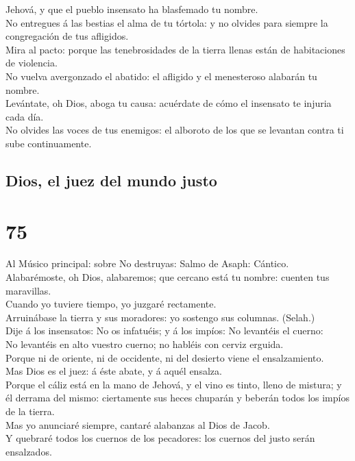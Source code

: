 Jehová, y que el pueblo insensato ha blasfemado tu nombre.\\
 No entregues á las bestias el alma de tu tórtola: y no
olvides para siempre la congregación de tus afligidos.\\
 Mira al pacto: porque las tenebrosidades de la tierra
llenas están de habitaciones de violencia.\\
 No vuelva avergonzado el abatido: el afligido y el
menesteroso alabarán tu nombre.\\
 Levántate, oh Dios, aboga tu causa: acuérdate de cómo el
insensato te injuria cada día.\\
 No olvides las voces de tus enemigos: el alboroto de los
que se levantan contra ti sube continuamente.

\hypertarget{dios-el-juez-del-mundo-justo}{%
\subsection{Dios, el juez del mundo
justo}\label{dios-el-juez-del-mundo-justo}}

\hypertarget{section-19-75}{%
\section{75}\label{section-19-75}}

 Al Músico principal: sobre No destruyas: Salmo de Asaph:
Cántico. Alabarémoste, oh Dios, alabaremos; que cercano está tu nombre:
cuenten tus maravillas.\\
 Cuando yo tuviere tiempo, yo juzgaré rectamente.\\
 Arruinábase la tierra y sus moradores: yo sostengo sus
columnas. (Selah.)\\
 Dije á los insensatos: No os infatuéis; y á los impíos:
No levantéis el cuerno:\\
 No levantéis en alto vuestro cuerno; no habléis con
cerviz erguida.\\
 Porque ni de oriente, ni de occidente, ni del desierto
viene el ensalzamiento.\\
 Mas Dios es el juez: á éste abate, y á aquél ensalza.\\
 Porque el cáliz está en la mano de Jehová, y el vino es
tinto, lleno de mistura; y él derrama del mismo: ciertamente sus heces
chuparán y beberán todos los impíos de la tierra.\\
 Mas yo anunciaré siempre, cantaré alabanzas al Dios de
Jacob.\\
 Y quebraré todos los cuernos de los pecadores: los
cuernos del justo serán ensalzados.

